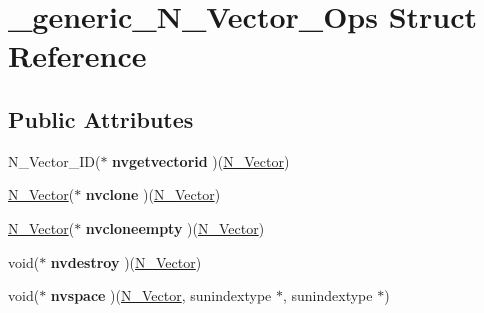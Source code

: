 \hypertarget{struct__generic__N__Vector__Ops}{}\section{\+\_\+generic\+\_\+\+N\+\_\+\+Vector\+\_\+\+Ops Struct Reference}
\label{struct__generic__N__Vector__Ops}
\subsection*{Public Attributes}
\begin{DoxyCompactItemize}
\item 
\mbox{\label{struct__generic__N__Vector__Ops_ac4efc7f1b8f142a461a5e6648296b690}} 
N\+\_\+\+Vector\+\_\+\+ID($\ast$ {\bfseries nvgetvectorid} )(\mbox{\hyperlink{struct__generic__N__Vector}{N\+\_\+\+Vector}})
\item 
\mbox{\label{struct__generic__N__Vector__Ops_a5baee2f2ebc1b088e98ff97ab40cf4b0}} 
\mbox{\hyperlink{struct__generic__N__Vector}{N\+\_\+\+Vector}}($\ast$ {\bfseries nvclone} )(\mbox{\hyperlink{struct__generic__N__Vector}{N\+\_\+\+Vector}})
\item 
\mbox{\label{struct__generic__N__Vector__Ops_aff51079d234fc4b9bfd97c4a0768334e}} 
\mbox{\hyperlink{struct__generic__N__Vector}{N\+\_\+\+Vector}}($\ast$ {\bfseries nvcloneempty} )(\mbox{\hyperlink{struct__generic__N__Vector}{N\+\_\+\+Vector}})
\item 
\mbox{\label{struct__generic__N__Vector__Ops_ab74565e386169c1cb0f0a97396547d4c}} 
void($\ast$ {\bfseries nvdestroy} )(\mbox{\hyperlink{struct__generic__N__Vector}{N\+\_\+\+Vector}})
\item 
\mbox{\label{struct__generic__N__Vector__Ops_af8f75ffd053060eaab868737ebfc5190}} 
void($\ast$ {\bfseries nvspace} )(\mbox{\hyperlink{struct__generic__N__Vector}{N\+\_\+\+Vector}}, sunindextype $\ast$, sunindextype $\ast$)
\item 
\mbox{\label{struct__generic__N__Vector__Ops_a6f2b75aba922d78c2cd512da67b703c3}} 

\end{DoxyCompactItemize}
